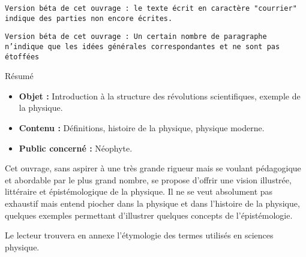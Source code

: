 
\texttt{Version béta de cet ouvrage : le texte écrit en caractère "courrier" indique des parties non encore écrites.}

\vspace{.3cm}

\texttt{Version béta de cet ouvrage : Un certain nombre de paragraphe n'indique que les idées générales correspondantes et ne sont pas étoffées}

\begin{center}
\Large
Résumé
\normalsize
\end{center}
\vspace{3cm}
\begin{itemize}[leftmargin=1cm, label=, itemsep=21pt]
\item {\bf Objet : } Introduction à la structure des révolutions scientifiques, exemple de la physique.
\item {\bf Contenu : } Définitions, histoire de la physique, physique moderne.
\item {\bf Public concerné : } Néophyte.
\end{itemize}

\vspace{3cm}

Cet ouvrage, sans aspirer à une très grande rigueur mais se voulant pédagogique et abordable par le plus grand nombre, se propose d'offrir une vision illustrée, littéraire et épistémologique de la physique. Il ne se veut absolument pas exhaustif mais entend piocher dans la physique et dans l'histoire de la physique, quelques exemples permettant d'illustrer quelques concepts de l'épistémologie.

\vspace{.3cm}

Le lecteur trouvera en annexe l'étymologie des termes utilisés en sciences physique.





